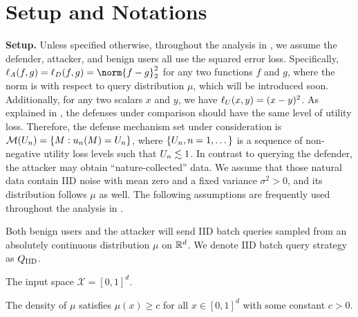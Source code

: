     \section{Setup and Notations}\label{subsec:notation}
        \textbf{Setup.} Unless specified otherwise, throughout the analysis in , we assume the defender, attacker, and benign users all use the squared error loss. Specifically, $\loss_A(f,g) = \loss_D(f,g) = \norm{f-g}_2^2$ for any two functions $f$ and $g$, where the norm is with respect to query distribution $\mu$, which will be introduced soon. Additionally, for any two scalars $x$ and $y$, we have $\ell_U(x,y) =  (x-y)^2$. As explained in , the defenses under comparison should have the same level of utility loss. Therefore, the defense mechanism set under consideration is $\mathcal{M}(U_n) = \{M: u_n(M) = U_n\}$, where $\{U_n,n=1,\dots\}$ is a sequence of non-negative utility loss levels such that $U_n \lesssim 1$. In contrast to querying the defender, the attacker may obtain ``nature-collected'' data. We assume that those natural data contain IID noise with mean zero and a fixed variance $\sigma^2>0$, and its distribution follows $\mu$ as well.
        The following assumptions are frequently used throughout the analysis in . 
        \begin{assumption}\label{asmp:same_query}
            Both benign users and the attacker will send IID batch queries sampled from an absolutely continuous distribution $\mu$ on $\mathbb{R}^d$. We denote IID batch query strategy as $Q_{\textrm{IID}}$. 
        \end{assumption}
        
        \begin{assumption} \label{asmp:bounded_input}
            The input space $\mathcal{X} = [0,1]^d$.
        \end{assumption}

        \begin{assumption}\label{samp:density}
            The density of $\mu$ satisfies $\mu(x) \geq c$ for all $x \in [0,1]^d$ with some constant $c>0$.
        \end{assumption}


